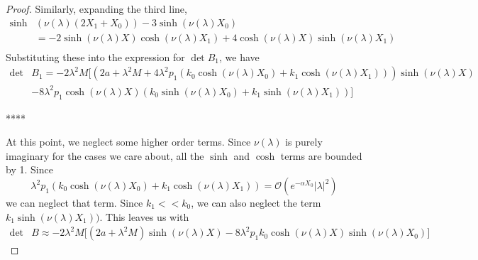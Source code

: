 \documentclass[thesis.tex]{subfiles}
\begin{document}
\begin{lemma}
\begin{proof}
Similarly, expanding the third line,
\begin{align*}
\sinh&(\nu(\lambda)(2 X_1 + X_0)) - 3 \sinh(\nu(\lambda)X_0) \\
&= -2 \sinh(\nu(\lambda)X)\cosh(\nu(\lambda)X_1) 
+ 4 \cosh(\nu(\lambda)X)\sinh(\nu(\lambda)X_1) \\
\end{align*}
Substituting these into the expression for $\det B_1$, we have
\begin{align*}
\det &B_1 = -2 \lambda^2 M \Big[ (2a + \lambda^2 M 
+ 4 \lambda^2 p_1(k_0 \cosh(\nu(\lambda)X_0) + k_1 \cosh(\nu(\lambda)X_1)  ) ) \sinh(\nu(\lambda)X)  \\
&- 8 \lambda^2 p_1 \cosh(\nu(\lambda)X) \left( k_0 \sinh(\nu(\lambda)X_0) 
+ k_1 \sinh(\nu(\lambda)X_1) \right) \Big] 
\end{align*}

****



At this point, we neglect some higher order terms. Since $\nu(\lambda)$ is purely imaginary for the cases we care about, all the $\sinh$ and $\cosh$ terms are bounded by 1. Since 
\[
\lambda^2 p_1(k_0 \cosh(\nu(\lambda)X_0) + k_1 \cosh(\nu(\lambda)X_1)  ) = \mathcal{O}(e^{-\alpha X_0}|\lambda|^2)
\]
we can neglect that term. Since $k_1 << k_0$, we can also neglect the term $k_1 \sinh(\nu(\lambda)X_1) )$. This leaves us with 
\begin{align*}
\det &B \approx -2 \lambda^2 M \Big[ (2a + \lambda^2 M  ) \sinh(\nu(\lambda)X) - 8 \lambda^2 p_1 k_0 \cosh(\nu(\lambda)X) \sinh(\nu(\lambda)X_0) \Big]
\end{align*}

\end{proof}
\end{lemma}
\end{document}
